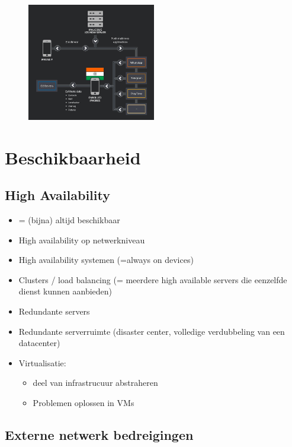 \documentclass{article}
\begin{document}
\begin{figure}[H]
    \centering
    \includegraphics[width=0.5\textwidth]{malware-iphone.png}
    \caption{}
\end{figure}

\section{Beschikbaarheid}

\subsection{High Availability}

\begin{itemize}
    \item = (bijna) altijd beschikbaar
    \item High availability op netwerkniveau
    \item High availability systemen (=always on devices)
    \item Clusters / load balancing (= meerdere high available servers die eenzelfde dienst kunnen aanbieden)
    \item Redundante servers
    \item Redundante serverruimte (disaster center, volledige verdubbeling van een datacenter)
    \item Virtualisatie: 
    \begin{itemize}
        \item deel van infrastrucuur abstraheren
        \item Problemen oplossen in VMs
    \end{itemize} 
\end{itemize}

\subsection{Externe netwerk bedreigingen}
\end{document}
